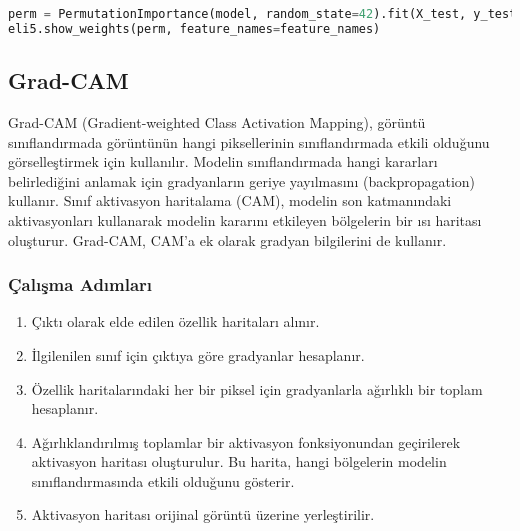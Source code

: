 \begin{lstlisting}[language=Python]
perm = PermutationImportance(model, random_state=42).fit(X_test, y_test)
eli5.show_weights(perm, feature_names=feature_names)
\end{lstlisting}

\subsection{Grad-CAM}
Grad-CAM (Gradient-weighted Class Activation Mapping), görüntü sınıflandırmada görüntünün hangi piksellerinin sınıflandırmada etkili olduğunu görselleştirmek için kullanılır. Modelin sınıflandırmada hangi kararları belirlediğini anlamak için gradyanların geriye yayılmasını (backpropagation) kullanır. Sınıf aktivasyon haritalama (CAM), modelin son katmanındaki aktivasyonları kullanarak modelin kararını etkileyen bölgelerin bir ısı haritası oluşturur. Grad-CAM, CAM'a ek olarak gradyan bilgilerini de kullanır.

\subsubsection{Çalışma Adımları}
\begin{enumerate}
    \item Çıktı olarak elde edilen özellik haritaları alınır.
    \item İlgilenilen sınıf için çıktıya göre gradyanlar hesaplanır.
    \item Özellik haritalarındaki her bir piksel için gradyanlarla ağırlıklı bir toplam hesaplanır. 
    \item Ağırlıklandırılmış toplamlar bir aktivasyon fonksiyonundan geçirilerek aktivasyon haritası oluşturulur. Bu harita, hangi bölgelerin modelin sınıflandırmasında etkili olduğunu gösterir.
    \item Aktivasyon haritası orijinal görüntü üzerine yerleştirilir.
\end{enumerate}

\newpage